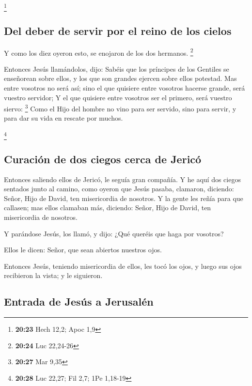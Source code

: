 \footnote{\textbf{20:23} Hech 12,2; Apoc 1,9}

\hypertarget{del-deber-de-servir-por-el-reino-de-los-cielos}{%
\subsection{Del deber de servir por el reino de los
cielos}\label{del-deber-de-servir-por-el-reino-de-los-cielos}}

 Y como los diez oyeron esto, se enojaron de los dos
hermanos. \footnote{\textbf{20:24} Luc 22,24-26}

 Entonces Jesús llamándolos, dijo: Sabéis que los príncipes
de los Gentiles se enseñorean sobre ellos, y los que son grandes ejercen
sobre ellos potestad.  Mas entre vosotros no será así; sino
el que quisiere entre vosotros hacerse grande, será vuestro servidor;
 Y el que quisiere entre vosotros ser el primero, será
vuestro siervo: \footnote{\textbf{20:27} Mar 9,35}  Como el
Hijo del hombre no vino para ser servido, sino para servir, y para dar
su vida en rescate por muchos.

\footnote{\textbf{20:28} Luc 22,27; Fil 2,7; 1Pe 1,18-19}

\hypertarget{curaciuxf3n-de-dos-ciegos-cerca-de-jericuxf3}{%
\subsection{Curación de dos ciegos cerca de
Jericó}\label{curaciuxf3n-de-dos-ciegos-cerca-de-jericuxf3}}

 Entonces saliendo ellos de Jericó, le seguía gran
compañía.  Y he aquí dos ciegos sentados junto al camino,
como oyeron que Jesús pasaba, clamaron, diciendo: Señor, Hijo de David,
ten misericordia de nosotros.  Y la gente les reñía para
que callasen; mas ellos clamaban más, diciendo: Señor, Hijo de David,
ten misericordia de nosotros.

 Y parándose Jesús, los llamó, y dijo: ¿Qué queréis que
haga por vosotros?

 Ellos le dicen: Señor, que sean abiertos nuestros ojos.

 Entonces Jesús, teniendo misericordia de ellos, les tocó
los ojos, y luego sus ojos recibieron la vista; y le siguieron.

\hypertarget{entrada-de-jesuxfas-a-jerusaluxe9n}{%
\subsection{Entrada de Jesús a
Jerusalén}\label{entrada-de-jesuxfas-a-jerusaluxe9n}}

